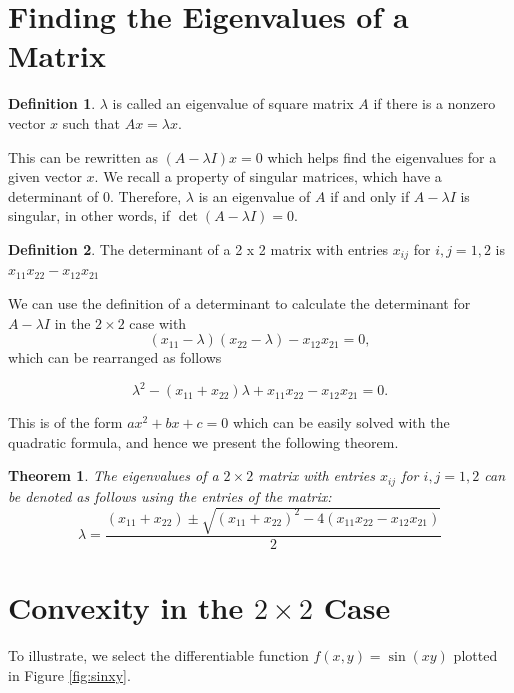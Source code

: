 \documentclass[12pt]{article}
\numberwithin{equation}{section}
\numberwithin{figure}{section}
\numberwithin{table}{section}
\newtheorem{theorem}{Theorem}[section]
\theoremstyle{definition}
\newtheorem{definition}{Definition}[section]
\theoremstyle{remark}
\numberwithin{equation}{section}
\begin{document}
\section{Finding the Eigenvalues of a Matrix}
\label{eigenvalues}

\begin{definition}
	$\lambda $ is called an eigenvalue of square matrix $A$ if there is a nonzero vector $x$ such that $Ax = \lambda x$.
\end{definition}

This can be rewritten as $(A - \lambda I)x = 0$ which helps find the eigenvalues for a given vector $x$. We recall a property of singular matrices, which have a determinant of 0. Therefore, $\lambda$ is an eigenvalue of $A$ if and only if $A - \lambda I$ is singular, in other words, if $\det(A - \lambda I) = 0$.

\begin{definition}
	The determinant of a 2 x 2 matrix with entries $x_{ij}$ for $i, j = 1,2$ is $x_{11}x_{22} - x_{12}x_{21}$
\end{definition}

We can use the definition of a determinant to calculate the determinant for $A - \lambda I$ in the $2 \times 2$ case with
\[
(x_{11} - \lambda)(x_{22} - \lambda) - x_{12}x_{21} = 0,
\]
which can be rearranged as follows

\[
\lambda^2 - (x_{11} + x_{22})\lambda + x_{11}x_{22} - x_{12}x_{21} = 0.
\]

This is of the form $ax^2+bx+c=0$ which can be easily solved with the quadratic formula, and hence we present the following theorem.

\begin{theorem}
	\label{theorem:2x2eigenvalues}
	The eigenvalues of a $2 \times 2$ matrix with entries $x_{ij}$ for $i, j = 1,2$ can be denoted as follows using the entries of the matrix:
	\[
	\lambda = \frac{(x_{11} + x_{22}) \pm \sqrt{(x_{11} + x_{22})^2 - 4(x_{11}x_{22} - x_{12}x_{21})}}{2}
	\]
\end{theorem}



\section{Convexity in the $2 \times 2$ Case}
\label{case}

To illustrate, we select the differentiable function $f(x, y) = \sin(xy)$ plotted in Figure \ref{fig:sinxy}.
\end{document}
